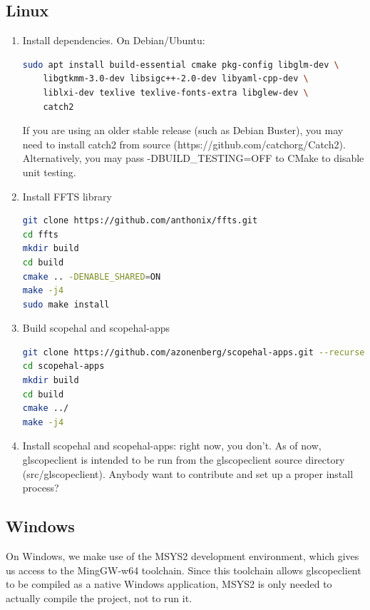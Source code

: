 \subsection{Linux}
\begin{enumerate}

\item Install dependencies. On Debian/Ubuntu:
\begin{lstlisting}[language=sh]
sudo apt install build-essential cmake pkg-config libglm-dev \
	libgtkmm-3.0-dev libsigc++-2.0-dev libyaml-cpp-dev \
	liblxi-dev texlive texlive-fonts-extra libglew-dev \
	catch2
\end{lstlisting}

If you are using an older stable release (such as Debian Buster), you may need to install catch2 from source
(https://github.com/catchorg/Catch2). Alternatively, you may pass -DBUILD\_TESTING=OFF to CMake to disable unit testing.

\item Install FFTS library
\begin{lstlisting}[language=sh]
git clone https://github.com/anthonix/ffts.git
cd ffts
mkdir build
cd build
cmake .. -DENABLE_SHARED=ON
make -j4
sudo make install
\end{lstlisting}

\item Build scopehal and scopehal-apps
\begin{lstlisting}[language=sh]
git clone https://github.com/azonenberg/scopehal-apps.git --recurse-submodules
cd scopehal-apps
mkdir build
cd build
cmake ../
make -j4
\end{lstlisting}

\item Install scopehal and scopehal-apps: right now, you don't. As of now, glscopeclient is intended to be run from the
glscopeclient source directory (src/glscopeclient). Anybody want to contribute and set up a proper install process?

\end{enumerate}

\subsection{Windows}

On Windows, we make use of the MSYS2 development environment, which gives us access to the MingGW-w64 toolchain. Since this toolchain allows glscopeclient to be compiled as a native Windows application, MSYS2 is only needed to actually compile the project, not to run it.

